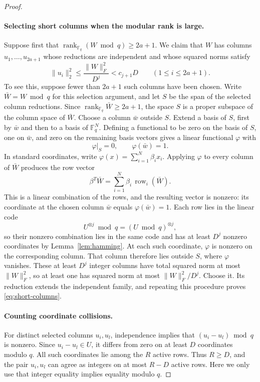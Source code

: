 \documentclass[11pt,letterpaper]{article}
\numberwithin{equation}{section}
\theoremstyle{definition}
\theoremstyle{remark}
\DeclareMathOperator{\rank}{rank}
\newcommand{\F}{\mathbb F}
\begin{document}
\begin{proof}
\paragraph{Selecting short columns when the modular rank is large.}
Suppose first that $\rank_{\F_q}(W\bmod q)\ge2a+1$. We claim that $W$ has columns $u_1,\ldots,u_{2a+1}$ whose reductions are independent and whose squared norms satisfy
\begin{equation}\label{eq:short-columns}
 \|u_i\|_2^2\le\frac{\|W\|_F^2}{D^j}<c_{j+1}D
 \qquad(1\le i\le2a+1).
\end{equation}
To see this, suppose fewer than $2a+1$ such columns have been chosen. Write $\bar W=W\bmod q$ for this selection argument, and let $S$ be the span of the selected column reductions. Since $\rank_{\F_q}\bar W\ge2a+1$, the space $S$ is a proper subspace of the column space of $\bar W$. Choose a column $\bar w$ outside $S$. Extend a basis of $S$, first by $\bar w$ and then to a basis of $\F_q^N$. Defining a functional to be zero on the basis of $S$, one on $\bar w$, and zero on the remaining basis vectors gives a linear functional $\varphi$ with
\[
 \varphi|_S=0,\qquad \varphi(\bar w)=1.
\]
In standard coordinates, write $\varphi(x)=\sum_{i=1}^N\beta_i x_i$. Applying $\varphi$ to every column of $\bar W$ produces the row vector
\[
 \beta^T\bar W=\sum_{i=1}^N\beta_i\,\operatorname{row}_i(\bar W).
\]
This is a linear combination of the rows, and the resulting vector is nonzero: its coordinate at the chosen column $\bar w$ equals $\varphi(\bar w)=1$. Each row lies in the linear code
\[
 U^{\otimes j}\bmod q=(U\bmod q)^{\otimes j},
\]
so their nonzero combination lies in the same code and has at least $D^j$ nonzero coordinates by Lemma~\ref{lem:hamming}. At each such coordinate, $\varphi$ is nonzero on the corresponding column. That column therefore lies outside $S$, where $\varphi$ vanishes. These at least $D^j$ integer columns have total squared norm at most $\|W\|_F^2$, so at least one has squared norm at most $\|W\|_F^2/D^j$. Choose it. Its reduction extends the independent family, and repeating this procedure proves \eqref{eq:short-columns}.

\paragraph{Counting coordinate collisions.}
For distinct selected columns $u_i,u_l$, independence implies that $(u_i-u_l)\bmod q$ is nonzero. Since $u_i-u_l\in U$, it differs from zero on at least $D$ coordinates modulo $q$. All such coordinates lie among the $R$ active rows. Thus $R\ge D$, and the pair $u_i,u_l$ can agree as integers on at most $R-D$ active rows. Here we only use that integer equality implies equality modulo $q$.


\end{proof}
\end{document}
